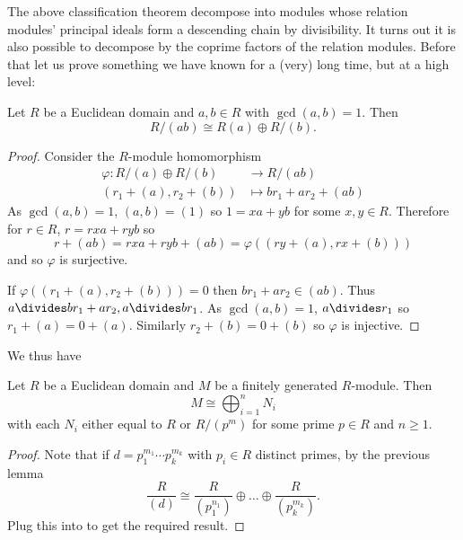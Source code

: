 \documentclass[a4paper]{article}
\theoremstyle{definition}
\begin{document}
The above classification theorem decompose into modules whose relation modules' principal ideals form a descending chain by divisibility. It turns out it is also possible to decompose by the coprime factors of the relation modules. Before that let us prove something we have known for a (very) long time, but at a high level:

\begin{lemma}
  Let \(R\) be a Euclidean domain and \(a, b \in R\) with \(\gcd(a, b) = 1\). Then
  \[
    R/(ab) \cong R(a) \oplus R/(b).
  \]
\end{lemma}

\begin{proof}
  Consider the \(R\)-module homomorphism
  \begin{align*}
    \varphi: R/(a) \oplus R/(b) &\to R/(ab) \\
    (r_1 + (a), r_2 + (b)) &\mapsto br_1 + ar_2 + (ab)
  \end{align*}
  As \(\gcd(a, b) = 1\), \((a, b) = (1)\) so \(1 = xa + yb\) for some \(x, y \in R\). Therefore for \(r \in R\), \(r = rxa + ryb\) so
  \[
    r + (ab) = rxa + ryb + (ab) = \varphi((ry + (a), rx + (b)))
  \]
  and so \(\varphi\) is surjective.

  If \(\varphi((r_1 + (a), r_2 + (b))) = 0\) then \(br_1 + ar_2 \in (ab)\). Thus \(a \divides br_1 + ar_2, a \divides br_1\). As \(\gcd(a, b) = 1\), \(a \divides r_1\) so \(r_1 + (a) = 0 + (a)\). Similarly \(r_2 + (b) = 0 + (b)\) so \(\varphi\) is injective.
\end{proof}

We thus have

\begin{theorem}
  \label{thm:primary decomposition}
  Let \(R\) be a Euclidean domain and \(M\) be a finitely generated \(R\)-module. Then
  \[
    M \cong \bigoplus_{i = 1}^n N_i
  \]
  with each \(N_i\) either equal to \(R\) or \(R/(p^m)\) for some prime \(p \in R\) and \(n \geq 1\).
\end{theorem}

\begin{proof}
  Note that if \(d = p_1^{m_1} \cdots p_k^{m_k}\) with \(p_i \in R\) distinct primes, by the previous lemma
  \[
    \frac{R}{(d)} \cong \frac{R}{(p_1^{n_1})} \oplus \dots \oplus \frac{R}{(p_k^{m_k})}.
  \]
  Plug this into  to get the required result.
\end{proof}
\end{document}

